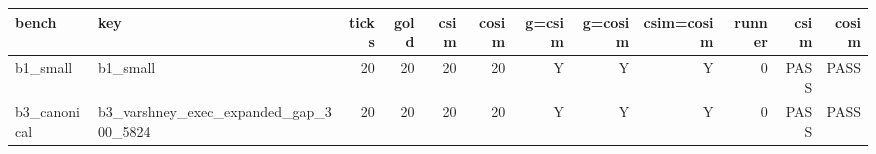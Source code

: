 \begin{tabular}{l l r r r r r r r r r r}
\hline
bench & key & ticks & gold & csim & cosim & g=csim & g=cosim & csim=cosim & runner & csim & cosim \\
\hline
b1\_small & b1\_small & 20 & 20 & 20 & 20 & Y & Y & Y & 0 & PASS & PASS \\
b3\_canonical & b3\_varshney\_exec\_expanded\_gap\_300\_5824 & 20 & 20 & 20 & 20 & Y & Y & Y & 0 & PASS & PASS \\
\hline
\end{tabular}
